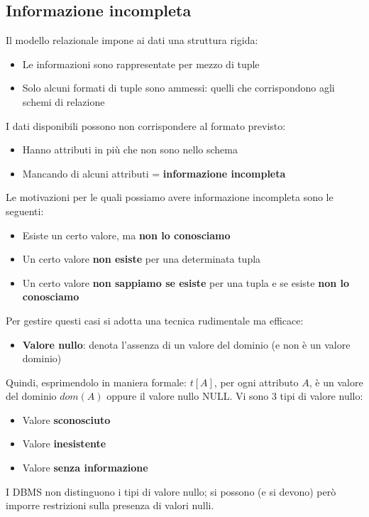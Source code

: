\documentclass[12pt]{article}
\begin{document}
\subsection{Informazione incompleta}
Il modello relazionale impone ai dati una struttura rigida:
\begin{itemize}
    \item Le informazioni sono rappresentate per mezzo di tuple
    \item Solo alcuni formati di tuple sono ammessi: quelli che corrispondono agli schemi di relazione
\end{itemize}
I dati disponibili possono non corrispondere al formato previsto:
\begin{itemize}
    \item Hanno attributi in più che non sono nello schema
    \item Mancando di alcuni attributi = \textbf{informazione incompleta}
\end{itemize}
Le motivazioni per le quali possiamo avere informazione incompleta sono le seguenti:
\begin{itemize}
    \item Esiste un certo valore, ma \textbf{non lo conosciamo}
    \item Un certo valore \textbf{non esiste} per una determinata tupla
    \item Un certo valore \textbf{non sappiamo se esiste} per una tupla e se esiste \textbf{non lo conosciamo}
\end{itemize}
Per gestire questi casi si adotta una tecnica rudimentale ma efficace:
\begin{itemize}
    \item \textbf{Valore nullo}: denota l'assenza di un valore del dominio (e non è un valore dominio)
\end{itemize}
Quindi, esprimendolo in maniera formale: \newline
$t[A]$, per ogni attributo $A$, è un valore del dominio $dom(A)$ oppure il valore nullo NULL.
Vi sono 3 tipi di valore nullo:
\begin{itemize}
    \item Valore \textbf{sconosciuto}
    \item Valore \textbf{inesistente}
    \item Valore \textbf{senza informazione}
\end{itemize}
I DBMS non distinguono i tipi di valore nullo; si possono (e si devono) però imporre restrizioni sulla presenza di valori nulli.
\end{document}
